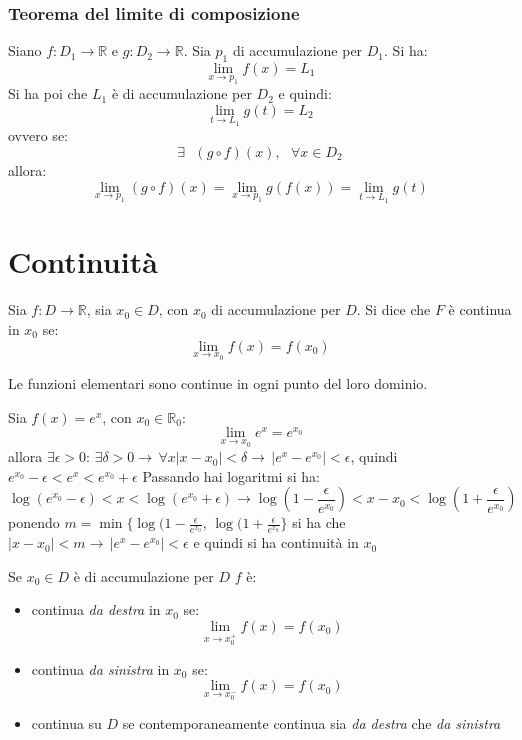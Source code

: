 \documentclass[a4paper,12pt, oneside]{book}
\begin{document}
\subsubsection{Teorema del limite di composizione}
\begin{teorema}
	Siano $f:D_1\rightarrow \mathbb{R}$ e $g:D_2\rightarrow \mathbb{R}$. Sia $p_1$ di accumulazione per $D_1$. Si ha:
	$$\lim_{x\rightarrow p_1} f(x)=L_1$$
	Si ha poi che $L_1$ è di accumulazione per $D_2$ e quindi:
	$$\lim_{t\rightarrow L_1} g(t)=L_2$$
	ovvero se:
	$$\exists \mbox{ } (g\circ f)(x), \mbox{ } \forall x\in D_2$$
	allora:
	$$\lim_{x\rightarrow p_1}(g\circ f)(x)=\lim_{x\rightarrow p_1}g(f(x))=\lim_{t\rightarrow L_1}g(t)$$
\end{teorema}
\section{Continuità}
Sia $f:D\rightarrow \mathbb{R}$, sia $x_0\in D$, con $x_0$ di accumulazione per $D$. Si dice che $F$ è continua in $x_0$ se:
$$\lim_{x\rightarrow x_0} f(x)=f(x_0)$$
\begin{teorema}
	Le funzioni elementari sono continue in ogni punto del loro dominio.
\end{teorema}
\begin{esempio}
	Sia $f(x)=e^x$, con $x_0\in\mathbb{R}_0$:
	$$\lim_{x\rightarrow x_0} e^x=e^{x_0}$$
	allora $\exists \epsilon>0:\,\exists \delta>0\rightarrow \, \forall x |x-x_0|<\delta\rightarrow \, |e^x-e^{x_0}|<\epsilon$, quindi $e^{x_0}-\epsilon<e^x<e^{x_0}+\epsilon$
	Passando hai logaritmi si ha:
	$$\log(e^{x_0}-\epsilon)<x<\log(e^{x_0}+\epsilon)\longrightarrow \log(1-\frac{\epsilon}{e^{x_0}})<x-x_0<\log(1+\frac{\epsilon}{e^{x_0}})$$
	ponendo $m=\min\{\log(1-\frac{\epsilon}{e^{x_0}},\,\log(1+\frac{\epsilon}{e^{x_0}}\}$ si ha che $|x-x_0|<m\rightarrow \, |e^x-e^{x_0}|<\epsilon$ e quindi si ha continuità in $x_0$
\end{esempio}
\begin{nota}
	Se $x_0\in D$ è di accumulazione per $D$ $f$ è:
	\begin{itemize}
		\item continua \textit{da destra} in $x_0$ se:
		      $$\lim_{x\rightarrow x_0^{+}} f(x)=f(x_0)$$
		\item continua \textit{da sinistra} in $x_0$ se:
		      $$\lim_{x\rightarrow x_0^{-}} f(x)=f(x_0)$$
		\item continua su $D$ se contemporaneamente continua sia \textit{da destra} che \textit{da sinistra}
	\end{itemize}
\end{nota}
\newpage
\end{document}
